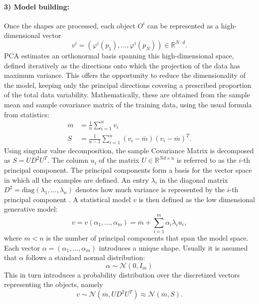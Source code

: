 \documentclass{InsightArticle}
\def\R{\mathds{R}} %
\begin{document}
\paragraph{3) Model building:}
Once the shapes are processed, each object $O^i$ can be
represented as a high-dimensional vector 
\[
v^i = (\varphi^i(p_1), \ldots, \varphi^i(p_N)) \in \R^{N\cdot d}.  
\]
PCA estimates an orthonormal basis spanning this
high-dimensional space, defined iteratively as the directions onto
which the projection of the data has maximum variance. This offers the
opportunity to reduce the dimensionality of the model, keeping only
the principal directions covering a prescribed proportion of the total
data variability.  Mathematically, these are obtained from the sample mean and sample covariance matrix of the 
training data, using the usual formula from statistics:
\begin{equation}
 \begin{split}
   \overline{m} & = \frac{1}{n} \sum_{i=1}^n v_i \\
   S &= \frac{1}{n-1} \sum_{i=1}^n (v_i - \overline{m}) (v_i - \overline{m})^T.
   \end{split}
\end{equation}
Using singular value decomposition, the sample Covariance Matrix is decomposed
as $S=UD^2U^T$. The column $u_i$ of the 
matrix $U \in \R^{Nd \times {n}}$ is referred to as the $i$-th principal component.
The principal components form a basis for the vector space in which all the examples are defined. 
An entry $\lambda_i$ in the diagonal matrix $D^2 = \text{diag}(\lambda_1, \ldots, \lambda_{n})$ denotes how much variance is represented by the $i$-th principal component \cite{mardia_multivariate_1980}.
A statistical model $v$ is then defined as the low dimensional generative model:
\[
v = v(\alpha_1, \ldots, \alpha_m) = \overline{m}  + \sum_{i=1}^m \alpha_i \lambda_i u_i, 
\]
where $m < n$ is the number of principal components that span the model space.
Each vector $\alpha = (\alpha_1, \ldots, \alpha_m)$ introduces a unique shape. 
Usually it is assumed that $\alpha$ follows a standard normal distribution: 
\begin{equation} \label{eq:coeff-normal-assumption}
\alpha  \sim \mathcal{N}(0, I_m)
\end{equation}
This in turn introduces a probability distribution over the discretized vectors representing the objects, namely 
\begin{equation} \label{eq:prob-interpretation}
v \sim \mathcal{N}(\overline{m}, UD^2U^T) \approx \mathcal{N}(\overline{m}, S).
\end{equation}
\end{document}
